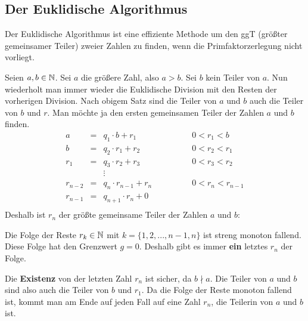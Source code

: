 \documentclass[main.tex]{subfiles}
\begin{document}
\subsection{Der Euklidische Algorithmus}

Der Euklidische Algorithmus ist eine effiziente Methode um den ggT (größter gemeinsamer Teiler) zweier Zahlen zu finden, wenn die Primfaktorzerlegung nicht vorliegt.

\begin{Definition}
	Seien $a,b \in \mathbb{N}$. Sei $a$ die größere Zahl, also $a > b$. Sei $b$ kein Teiler von $a$. Nun wiederholt man immer wieder die Euklidische Division mit den Resten der vorherigen Division. Nach obigem Satz sind die Teiler von $a$ und $b$ auch die Teiler von $b$ und $r$. Man möchte ja den ersten gemeinsamen Teiler der Zahlen $a$ und $b$ finden.
	$$\begin{array}{rccl}
		a & = & q_{1} \cdot b + r_{1} \qquad \qquad &0 < r_{1}  < b \\
		b & = & q_{2} \cdot r_{1} + r_{2} \qquad \qquad &0 < r_{2}  < r_{1} \\
		r_{1} & = & q_{3} \cdot r_{2} + r_{3} \qquad \qquad &0 < r_{3}  < r_{2} \\
		&& \vdots & \\
		r_{n-2} & = & q_{n} \cdot r_{n-1} + r_{n} \qquad \qquad &0 < r_{n}  < r_{n-1} \\
		r_{n-1} & = & q_{n+1} \cdot r_{n} + 0 \qquad \qquad &  \\
		\end{array}$$
	Deshalb ist $r_{n}$ der größte gemeinsame Teiler der Zahlen $a$ und $b$:
	
	Die Folge der Reste $r_{k} \in \mathbb{N}$ mit $k = \{1, 2, ..., n-1, n\}$ ist streng monoton fallend. Diese Folge hat den Grenzwert $g = 0$. Deshalb gibt es immer \textbf{ein} letztes $r_{n}$ der Folge.

	Die \textbf{Existenz} von der letzten Zahl $r_{n}$ ist sicher, da $b \nmid a$. Die Teiler von $a$ und $b$ sind also auch die Teiler von $b$ und $r_{1}$. Da die Folge der Reste monoton fallend ist, kommt man am Ende auf jeden Fall auf eine Zahl $r_{n}$, die Teilerin von $a$ und $b$ ist.
\end{Definition}
\end{document}
